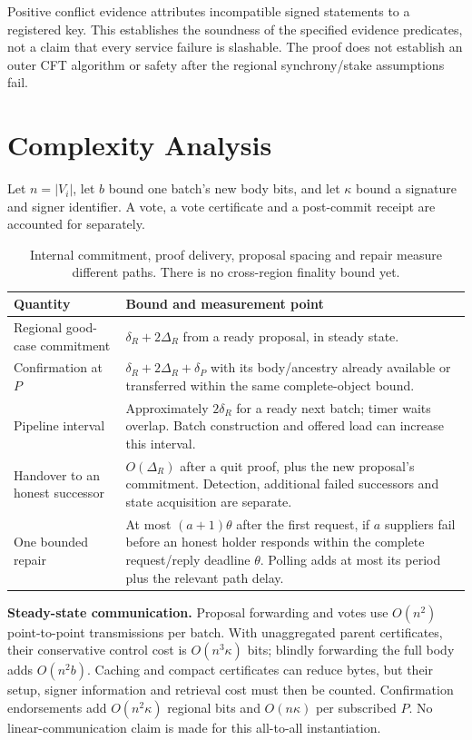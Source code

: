 \documentclass[11pt,a4paper,onecolumn]{article}
\begin{document}
Positive conflict evidence attributes incompatible signed statements to a
registered key. This establishes the soundness of the specified evidence
predicates, not a claim that every service failure is slashable. The proof
does not establish an outer CFT algorithm or safety after the regional
synchrony/stake assumptions fail.

\section{Complexity Analysis}\label{sec:complexity}
Let $n=|V_i|$, let $b$ bound one batch's new body bits, and let $\kappa$ bound
a signature and signer identifier. A vote, a vote certificate and a
post-commit receipt are accounted for separately.

\begin{table}[H]\centering\small
\begin{tabularx}{\textwidth}{@{}p{}Y@{}}\toprule
Quantity & Bound and measurement point\\\midrule
Regional good-case commitment &
$\delta_R+2\Delta_R$ from a ready proposal, in steady state.\\
Confirmation at $P$ &
$\delta_R+2\Delta_R+\delta_P$ with its body/ancestry already available or
transferred within the same complete-object bound.\\
Pipeline interval &
Approximately $2\delta_R$ for a ready next batch; timer waits overlap.
Batch construction and offered load can increase this interval.\\
Handover to an honest successor &
$O(\Delta_R)$ after a quit proof, plus the new proposal's commitment.
Detection, additional failed successors and state acquisition are separate.\\
One bounded repair &
At most $(a+1)\theta$ after the first request, if $a$ suppliers fail before
an honest holder responds within the complete request/reply deadline $\theta$.
Polling adds at most its period plus the relevant path delay.\\\bottomrule
\end{tabularx}
\caption{Internal commitment, proof delivery, proposal spacing and repair
measure different paths. There is no cross-region finality bound yet.}
\end{table}

\textbf{Steady-state communication.}
Proposal forwarding and votes use $O(n^2)$ point-to-point transmissions per
batch. With unaggregated parent certificates, their conservative control cost
is $O(n^3\kappa)$ bits; blindly forwarding the full body adds $O(n^2b)$.
Caching and compact certificates can reduce bytes, but their setup, signer
information and retrieval cost must then be counted. Confirmation endorsements
add $O(n^2\kappa)$ regional bits and $O(n\kappa)$ per subscribed $P$.
No linear-communication claim is made for this all-to-all instantiation.
\end{document}
